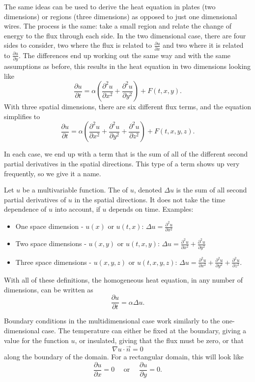 The same ideas can be used to derive the heat equation in plates (two dimensions) or regions (three dimensions) as opposed to just one dimensional wires. The process is the same: take a small region and relate the change of energy to the flux through each side. In the two dimensional case, there are four sides to consider, two where the flux is related to $\frac{\partial u}{\partial x}$ and two where it is related to $\frac{\partial u}{\partial y}$. The differences end up working out the same way and with the same assumptions as before, this results in the heat equation in two dimensions looking like
\[ \frac{\partial u}{\partial t} = \alpha \left( \frac{\partial^2 u}{\partial x^2} + \frac{\partial^2 u}{\partial y^2}\right) + F(t,x, y). \] With three spatial dimensions, there are six different flux terms, and the equation simplifies to 
\[ \frac{\partial u}{\partial t} = \alpha \left( \frac{\partial^2 u}{\partial x^2} + \frac{\partial^2 u}{\partial y^2} + \frac{\partial^2 u}{\partial z^2} \right) + F(t,x, y, z). \]

In each case, we end up with a term that is the sum of all of the different second partial derivatives in the spatial directions. This type of a term shows up very frequently, so we give it a name. 
\begin{definition}
Let $u$ be a multivariable function. The \emph{} of $u$, denoted $\Delta u$ is the sum of all second partial derivatives of $u$ in the spatial directions. It does not take the time dependence of $u$ into account, if $u$ depends on time.  Examples:
\begin{itemize}
\item One space dimension - $u(x)$ or $u(t,x)$: $\Delta u = \frac{\partial^2 u}{\partial x^2}$
\item Two space dimensions - $u(x,y)$ or $u(t,x,y)$: $\Delta u = \frac{\partial^2 u}{\partial x^2} + \frac{\partial^2 u}{\partial y^2}$
\item Three space dimensions - $u(x,y,z)$ or $u(t,x,y,z)$: $\Delta u = \frac{\partial^2 u}{\partial x^2} + \frac{\partial^2 u}{\partial y^2} + \frac{\partial^2 u}{\partial z^2}$.
\end{itemize}
\end{definition}

With all of these definitions, the homogeneous heat equation, in any number of dimensions, can be written as
\[ \frac{\partial u}{\partial t} = \alpha \Delta u. \]

Boundary conditions in the multidimensional case work similarly to the one-dimensional case. The temperature can either be fixed at the boundary, giving a value for the function $u$, or insulated, giving that the flux must be zero, or that 
\[ \nabla u \cdot \vec{n} = 0 \] along the boundary of the domain. For a rectangular domain, this will look like
\[ \frac{\partial u}{\partial x} = 0 \quad \text{ or } \quad \frac{\partial u}{\partial y} = 0. \]


